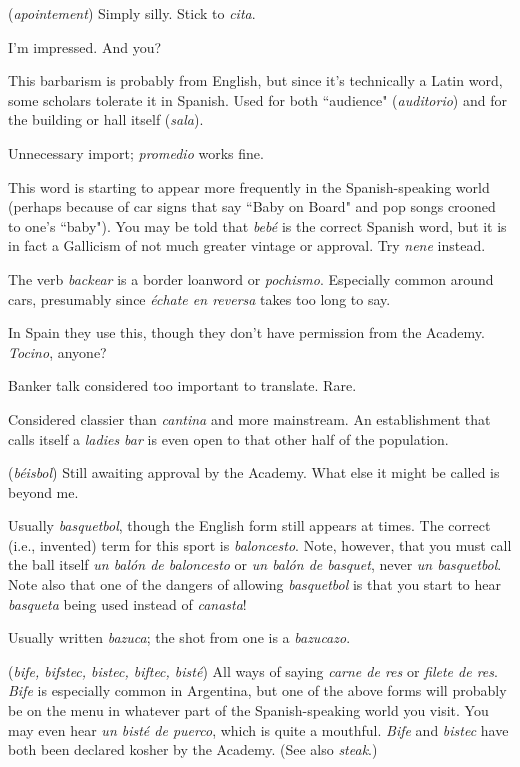  (\emph{apointement}) Simply silly. Stick to \emph{cita}.

 I'm impressed. And you?

 This barbarism is probably from English, but
since it's technically a Latin word, some scholars tolerate it in Spanish. Used for both ``audience" (\emph{auditorio}) and for the building or hall
itself (\emph{sala}).

 Unnecessary import; \emph{promedio} works fine.

 This word is starting to appear more frequently in the
Spanish-speaking world (perhaps because of car signs that say ``Baby on
Board" and pop songs crooned to one's ``baby"). You may be told that
\emph{bebé} is the correct Spanish word, but it is in fact a Gallicism of not
much greater vintage or approval. Try \emph{nene} instead.

 The verb \emph{backear} is a border loanword or \emph{pochismo}.
Especially common around cars, presumably since \emph{échate en reversa}
takes too long to say.

 In Spain they use this, though they don't have permission from the Academy. \emph{Tocino}, anyone?

 Banker talk considered too important to translate. Rare.

 Considered classier than \emph{cantina} and more mainstream.
An establishment that calls itself a \emph{ladies bar} is even open to that
other half of the population.

 (\emph{béisbol}) Still awaiting approval by the Academy.
What else it might be called is beyond me.

 Usually \emph{basquetbol}, though the English form
still appears at times. The correct (i.e., invented) term for this sport is
\emph{baloncesto}. Note, however, that you must call the ball itself \emph{un balón
de baloncesto} or \emph{un balón de basquet}, never \emph{un basquetbol}. Note also
that one of the dangers of allowing \emph{basquetbol} is that you start to hear
\emph{basqueta} being used instead of \emph{canasta}!

 Usually written \emph{bazuca}; the shot from one is a
\emph{bazucazo}.

 (\emph{bife, bifstec, bistec, biftec, bisté}) All ways of saying
\emph{carne de res} or \emph{filete de res}. \emph{Bife} is especially common in Argentina,
but one of the above forms will probably be on the menu in whatever
part of the Spanish-speaking world you visit. You may even hear \emph{un
bisté de puerco}, which is quite a mouthful. \emph{Bife} and \emph{bistec} have both
been declared kosher by the Academy. (See also \emph{steak}.)

